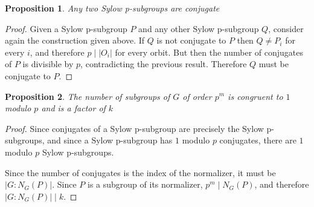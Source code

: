 \documentclass[12pt]{article}
\newtheorem{proposition}{Proposition}
\begin{document}
\begin{proposition}
Any two Sylow p-subgroups are conjugate
\end{proposition}

\begin{proof} Given a Sylow p-subgroup $P$ and any other Sylow p-subgroup $Q$, consider again the construction given above.  If $Q$ is not conjugate to $P$ then $Q\neq P_i$ for every $i$, and therefore $p\mid |O_i|$ for every orbit.  But then the number of conjugates of $P$ is divisible by $p$, contradicting the previous result.  Therefore $Q$ must be conjugate to $P$.
\end{proof}

\begin{proposition}
The number of subgroups of $G$ of order $p^m$ is congruent to $1$ modulo $p$ and is a factor of $k$
\end{proposition}

\begin{proof} Since conjugates of a Sylow p-subgroup are precisely the Sylow p-subgroups, and since a Sylow p-subgroup has $1$ modulo $p$ conjugates, there are $1$ modulo $p$ Sylow p-subgroups.

Since the number of conjugates is the index of the normalizer, it must be $|G:N_G(P)|$.  Since $P$ is a subgroup of its normalizer, $p^m\mid N_G(P)$, and therefore $|G:N_G(P)|\mid k$.
\end{proof}
\end{document}
